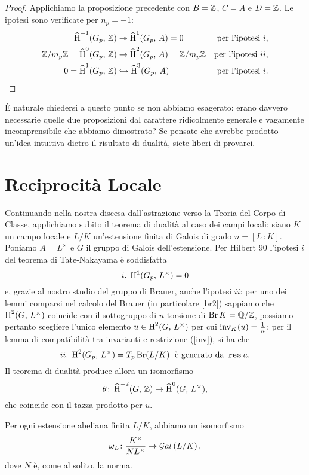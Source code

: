 \begin{proof}
	Applichiamo la proposizione precedente con $ B = \mathbb{Z} $, $ C = A $ e $ D = \mathbb{Z} $. Le ipotesi sono verificate per $ n_p = -1 $:
	\begin{align*}
		\operatorname{\widehat{H}}^{-1}(G_p,\, \mathbb{Z}) &\twoheadrightarrow \operatorname{\widehat{H}}^{1}(G_p,\, A) = 0 & \text{per l'ipotesi } i, \\
		\mathbb{Z}/m_p\mathbb{Z}=\operatorname{\widehat{H}}^{0}(G_p,\, \mathbb{Z}) &\to \operatorname{\widehat{H}}^{2}(G_p,\, A) = \mathbb{Z}/m_p\mathbb{Z} & \text{per l'ipotesi } ii,\\
		0 = \operatorname{\widehat{H}}^{1}(G_p,\, \mathbb{Z}) &\hookrightarrow \operatorname{\widehat{H}}^{3}(G_p,\, A) & \text{per l'ipotesi } i.
	\end{align*}
\end{proof}

È naturale chiedersi a questo punto se non abbiamo esagerato: erano davvero necessarie quelle due proposizioni dal carattere ridicolmente generale e vagamente incomprensibile che abbiamo dimostrato? Se pensate che avrebbe prodotto un'idea intuitiva dietro il risultato di dualità, siete liberi di provarci.

\section{Reciprocità Locale}


Continuando nella nostra discesa dall'astrazione verso la Teoria del Corpo di Classe, applichiamo subito il teorema di dualità al caso dei campi locali: siano $ K $ un campo locale e $ L / K  $ un'estensione finita di Galois di grado $ n = [L\,\colon K] $. Poniamo $ A = L^\times $ e $ G $ il gruppo di Galois dell'estensione. Per Hilbert 90 l'ipotesi $ i $ del teorema di Tate-Nakayama è soddisfatta 
\[ i. \; \operatorname{H}^1(G_p,\, L^\times) = 0 \]
e, grazie al nostro studio del gruppo di Brauer, anche l'ipotesi $ ii $: per uno dei lemmi comparsi nel calcolo del Brauer (in particolare \ref{br2}) sappiamo che $ \operatorname{H}^2(G, \, L^\times) $ coincide con il sottogruppo di $ n $-torsione di $ \operatorname{Br} K = \mathbb{Q}/\mathbb{Z} $, possiamo pertanto scegliere l'unico elemento $ u \in \operatorname{H}^2(G, \, L^\times) $ per cui $ \operatorname{inv}_K(u) = \frac{1}{n} $; per il lemma di compatibilità tra invarianti e restrizione (\ref{inv}), si ha che
\[ ii. \; \operatorname{H}^2(G_p, \, L^\times) = T_p \operatorname{Br}(L/K) \;\text{ è generato da } \operatorname{\mathtt{res}} u. \]
Il teorema di dualità produce allora un isomorfismo
\[ \theta\colon \operatorname{\widehat{H}}^{-2}(G, \, \mathbb{Z}) \to \operatorname{\widehat{H}}^{0}(G, \,  L^\times), \]
che coincide con il tazza-prodotto per $ u. $

\begin{theorem}
	Per ogni estensione abeliana finita $ L/K $, abbiamo un isomorfismo
	\[ \omega_L\colon \frac{K^\times}{NL^\times} \to \mathcal{G}al\left( L/K \right), \]
	dove $ N $ è, come al solito, la norma.
\end{theorem}

